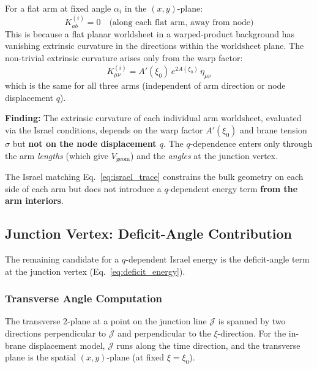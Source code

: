 For a flat arm at fixed angle $\alpha_i$ in the $(x,y)$-plane:
\begin{equation}
    K_{ab}^{(i)} = 0 \quad\text{(along each flat arm, away from node)}
    \label{eq:K_flat_arm}
\end{equation}
This is because a flat planar worldsheet in a warped-product background
has vanishing extrinsic curvature in the directions within the
worldsheet plane. The non-trivial extrinsic curvature arises only
from the warp factor:
\begin{equation}
    K_{\mu\nu}^{(i)} = A'(\xi_0)\, e^{2A(\xi_0)}\, \eta_{\mu\nu}
    \label{eq:K_warp}
\end{equation}
which is the same for all three arms (independent of arm direction
or node displacement $q$). \tagDc

\begin{edcopenbox}[title=Structural Result]
\textbf{Finding:} The extrinsic curvature of each individual arm
worldsheet, evaluated via the Israel conditions, depends on the
warp factor $A'(\xi_0)$ and brane tension $\sigma$ but
\textbf{not on the node displacement $q$}. The $q$-dependence
enters only through the arm \emph{lengths} (which give
$V_{\mathrm{geom}}$) and the \emph{angles} at the junction vertex.

The Israel matching Eq.~\eqref{eq:israel_trace} constrains the
bulk geometry on each side of each arm but does not introduce
a $q$-dependent energy term \textbf{from the arm interiors}.
\tagDc
\end{edcopenbox}

\subsection{Junction Vertex: Deficit-Angle Contribution}

The remaining candidate for a $q$-dependent Israel energy is the
deficit-angle term at the junction vertex (Eq.~\eqref{eq:deficit_energy}).

\subsubsection{Transverse Angle Computation}

The transverse 2-plane at a point on the junction line $\mathcal{J}$
is spanned by two directions perpendicular to $\mathcal{J}$ and
perpendicular to the $\xi$-direction. For the in-brane displacement
model, $\mathcal{J}$ runs along the time direction, and the transverse
plane is the spatial $(x, y)$-plane (at fixed $\xi = \xi_0$).

